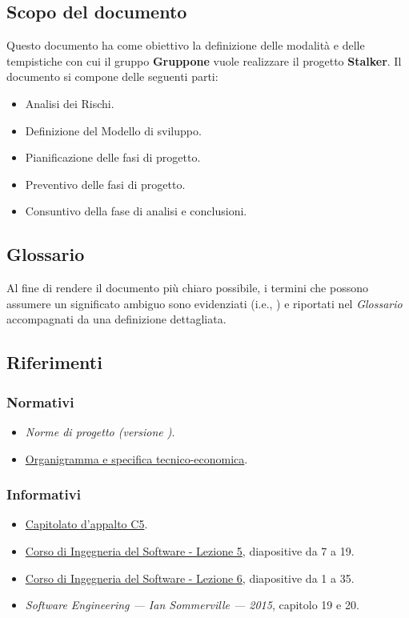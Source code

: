 \documentclass[../piano-di-progetto.tex]{subfiles}
\begin{document}
\subsection{Scopo del documento}%
\label{sub:scopo_del_documento}
Questo documento ha come obiettivo la definizione delle modalità e delle tempistiche con cui il gruppo \textbf{Gruppone} vuole realizzare il progetto \textbf{Stalker}.
Il documento si compone delle seguenti parti:
\begin{itemize}
  \item Analisi dei Rischi.
  \item Definizione del Modello di sviluppo.
  \item Pianificazione delle fasi di progetto.
  \item Preventivo delle fasi di progetto.
  \item Consuntivo della fase di analisi e conclusioni.
\end{itemize}

\scopoDelProdotto{}

\subsection{Glossario}%
\label{sub:glossario}
Al fine di rendere il documento più chiaro possibile, i termini che possono assumere un significato ambiguo sono evidenziati (i.e., ) e riportati nel \textit{Glossario} accompagnati da una definizione dettagliata.
\subsection{Riferimenti}%
\label{sub:riferimenti}
\subsubsection{Normativi}%
\label{subs:normativi}
\begin{itemize}
  \item \textit{Norme di progetto (versione \versione)}.
  \item \href{https://www.math.unipd.it/~tullio/IS-1/2019/Progetto/RO.html}{Organigramma e specifica tecnico-economica}.
\end{itemize}
\subsubsection{Informativi}%
\label{subs:informativi}
\begin{itemize}
  \item \href{https://www.math.unipd.it/~tullio/IS-1/2019/Progetto/C5.pdf}{Capitolato d'appalto C5}.
  \item \href{https://www.math.unipd.it/~tullio/IS-1/2019/Dispense/L05.pdf}{Corso di Ingegneria del Software - Lezione 5}, diapositive da 7 a 19.
  \item \href{https://www.math.unipd.it/~tullio/IS-1/2019/Dispense/L06.pdf}{Corso di Ingegneria del Software - Lezione 6}, diapositive da 1 a 35.
  \item \textit{Software Engineering --- Ian Sommerville --- 2015}, capitolo 19 e 20.
\end{itemize}%
\end{document}
